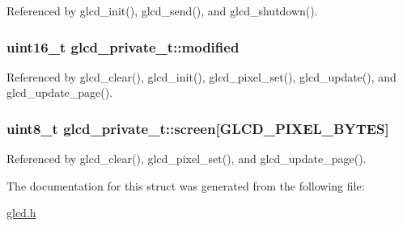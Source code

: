 Referenced by glcd\_\-init(), glcd\_\-send(), and glcd\_\-shutdown().\hypertarget{structglcd__private__t_2d461f58688ef3f69b8d4adb40564ee5}{
\subsubsection{\setlength{\rightskip}{0pt plus 5cm}uint16\_\-t {\bf glcd\_\-private\_\-t::modified}}}
\label{structglcd__private__t_2d461f58688ef3f69b8d4adb40564ee5}




Referenced by glcd\_\-clear(), glcd\_\-init(), glcd\_\-pixel\_\-set(), glcd\_\-update(), and glcd\_\-update\_\-page().\hypertarget{structglcd__private__t_0f132b59644c2141c547173ba7089f3d}{
\subsubsection{\setlength{\rightskip}{0pt plus 5cm}uint8\_\-t {\bf glcd\_\-private\_\-t::screen}\mbox{[}GLCD\_\-PIXEL\_\-BYTES\mbox{]}}}
\label{structglcd__private__t_0f132b59644c2141c547173ba7089f3d}




Referenced by glcd\_\-clear(), glcd\_\-pixel\_\-set(), and glcd\_\-update\_\-page().

The documentation for this struct was generated from the following file:\begin{CompactItemize}
\item 
\hyperlink{glcd_8h}{glcd.h}\end{CompactItemize}
